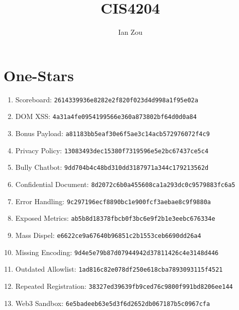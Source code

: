 \documentclass[12pt, letterpaper]{article}
\title{CIS4204}
\author{Ian Zou}
\begin{document}
\maketitle

\part*{One-Stars}

\begin{sloppypar}
    \begin{enumerate}
        \item Scoreboard: \texttt{2614339936e8282e2f820f023d4d998a1f95e02a}
        \item DOM XSS: \texttt{4a31a4fe0954199566e360a873802bf64d0d0a84}
        \item Bonus Payload: \texttt{a81183bb5eaf30e6f5ae3c14acb572976072f4c9}
        \item Privacy Policy: \texttt{13083493dec15380f7319596e5e2bc67437ce5c4}
        \item Bully Chatbot: \texttt{9dd704b4c48bd310dd3187971a344c179213562d}
        \item Confidential Document: \texttt{8d2072c6b0a455608ca1a293dc0c9579883fc6a5}
        \item Error Handling: \texttt{9c297196ecf8890bc1e900fcf3aebae8c9f9880a}
        \item Exposed Metrics: \texttt{ab5b8d18378fbcb0f3bc6e9f2b1e3eebc676334e}
        \item Mass Dispel: \texttt{e6622ce9a67640b96851c2b1553ceb6690dd26a4}
        \item Missing Encoding: \texttt{9d4e5e79b87d07944942d37811426c4e3148d446}
        \item Outdated Allowlist: \texttt{1ad816c82e078df250e618cba7893093115f4521}
        \item Repeated Registration: \texttt{38327ed39639fb9ced76c9800f991bd8206ee144}
        \item Web3 Sandbox: \texttt{6e5badeeb63e5d3f6d2652db067187b5c0967cfa}
    \end{enumerate}
\end{sloppypar}
\end{document}
